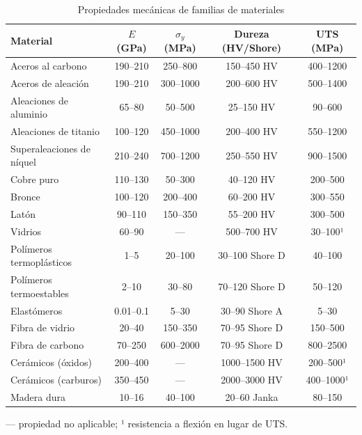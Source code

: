 \begin{table}[htbp]
  \centering
  \small
  \caption{Propiedades mecánicas de familias de materiales}
  \label{tab:prop_mat_mecanicas}
  \begin{tabular}{@{} l c c c c @{}}
    \toprule
    Material                  & $E$ (GPa) & $\sigma_y$ (MPa) & Dureza (HV/Shore) & UTS (MPa)\tnote{1} \\
    \midrule
    Aceros al carbono         & 190–210   & 250–800          & 150–450 HV        & 400–1200          \\
    Aceros de aleación        & 190–210   & 300–1000         & 200–600 HV        & 500–1400          \\
    Aleaciones de aluminio    & 65–80     & 50–500           & 25–150 HV         & 90–600            \\
    Aleaciones de titanio     & 100–120   & 450–1000         & 200–400 HV        & 550–1200          \\
    Superaleaciones de níquel & 210–240   & 700–1200         & 250–550 HV        & 900–1500          \\
    Cobre puro                & 110–130   & 50–300           & 40–120 HV         & 200–500           \\
    Bronce                    & 100–120   & 200–400          & 60–200 HV         & 300–550           \\
    Latón                     & 90–110    & 150–350          & 55–200 HV         & 300–500           \\
    Vidrios                   & 60–90     & —                & 500–700 HV        & 30–100¹           \\
    Polímeros termoplásticos  & 1–5       & 20–100           & 30–100 Shore D    & 40–100            \\
    Polímeros termoestables   & 2–10      & 30–80            & 70–120 Shore D    & 50–120            \\
    Elastómeros               & 0.01–0.1  & 5–30             & 30–90 Shore A     & 5–30              \\
    Fibra de vidrio           & 20–40     & 150–350          & 70–95 Shore D     & 150–500           \\
    Fibra de carbono          & 70–250    & 600–2000         & 70–95 Shore D     & 800–2500          \\
    Cerámicos (óxidos)        & 200–400   & —                & 1000–1500 HV      & 200–500¹          \\
    Cerámicos (carburos)      & 350–450   & —                & 2000–3000 HV      & 400–1000¹         \\
    Madera dura               & 10–16     & 40–100           & 20–60 Janka       & 80–150            \\
    \bottomrule
  \end{tabular}

  \vspace{1mm}
  \footnotesize
  — propiedad no aplicable; ¹ resistencia a flexión en lugar de UTS.
\end{table}

